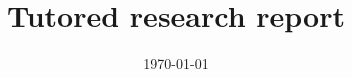 \title{\vspace{1.5cm}Tutored research report \\ \vspace{0.25cm} \LARGE{\textbf{\projecttitle}}}
\author{}
\date{\today}